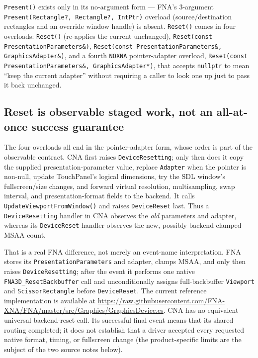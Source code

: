 \texttt{Present()} exists only in its no-argument form --- FNA's 3-argument
\texttt{Present(Rectangle?, Rectangle?, IntPtr)} overload (source/destination rectangles and an
override window handle) is absent. \texttt{Reset()} comes in four overloads:
\texttt{Reset()} (re-applies the current  unchanged),
\texttt{Reset(const PresentationParameters\&)}, \texttt{Reset(const PresentationParameters\&,
GraphicsAdapter\&)}, and a fourth \texttt{NOXNA} pointer-adapter overload,
\texttt{Reset(const PresentationParameters\&, GraphicsAdapter*)}, that accepts \texttt{nullptr}
to mean ``keep the current adapter'' without requiring a caller to look one up just to pass it
back unchanged.

\subsection{Reset is observable staged work, not an all-at-once success guarantee}
\label{sec:graphicsdevice-reset-order}

The four overloads all end in the pointer-adapter form, whose order is part of the observable
contract. CNA first raises \texttt{DeviceResetting}; only then does it copy the supplied
presentation-parameter value, replace \texttt{Adapter} when the pointer is non-null,
update TouchPanel's logical dimensions, try the SDL window's fullscreen/size changes, and forward
virtual resolution, multisampling, swap interval, and presentation-format fields to the backend.
It calls \texttt{UpdateViewportFromWindow()} and raises \texttt{DeviceReset} last. Thus a
\texttt{DeviceResetting} handler in CNA observes the \emph{old} parameters and adapter, whereas
its \texttt{DeviceReset} handler observes the new, possibly backend-clamped MSAA count.

That is a real FNA difference, not merely an event-name interpretation. FNA stores its
\texttt{PresentationParameters} and adapter, clamps MSAA, and only then raises
\texttt{DeviceResetting}; after the event it performs one native \texttt{FNA3D\_ResetBackbuffer}
call and unconditionally assigns full-backbuffer \texttt{Viewport} and
\texttt{ScissorRectangle} before \texttt{DeviceReset}. The current reference implementation is
available at \url{https://raw.githubusercontent.com/FNA-XNA/FNA/master/src/Graphics/GraphicsDevice.cs}.
CNA has no equivalent universal backend-reset call. Its successful final event means that its
shared routing completed; it does not establish that a driver accepted every requested native
format, timing, or fullscreen change (the product-specific limits are the subject of the two
source notes below).

